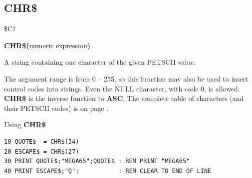 
\newpage
{}
\subsection{CHR\$}
\label{BASIC 65 Functions!CHR}
\begin{description}[leftmargin=2cm,style=nextline]
\item [Token:]   \$C7

\item [Format:]  {\bf CHR\$(}numeric expression{\bf)}

\item [Returns:] A string containing one character of the given PETSCII value.

\item [Remarks:] The argument range is from 0 -- 255, so this function may also be used to insert control codes into strings.
                 Even the NULL character, with code 0, is allowed. {\bf CHR\$} is the inverse function to {\bf ASC}. The complete table of characters (and their PETSCII codes) is on page \pageref{appendix:petsciicodes}.

\item [Example:] Using {\bf CHR\$}

\begin{tcolorbox}[colback=black,coltext=white]
\verbatimfont{\codefont}
\begin{verbatim}
10 QUOTE$  = CHR$(34)
20 ESCAPE$ = CHR$(27)
30 PRINT QUOTE$;"MEGA65";QUOTE$ : REM PRINT "MEGA65"
40 PRINT ESCAPE$;"Q";           : REM CLEAR TO END OF LINE
\end{verbatim}
\end{tcolorbox}
\end{description}


\newpage
